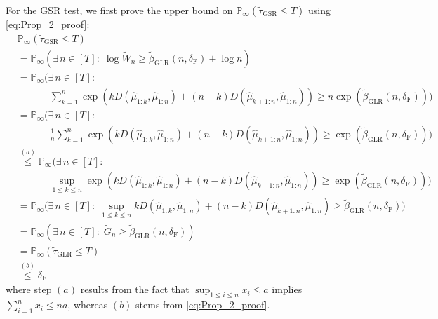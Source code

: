 \documentclass[12pt]{interact}
\newcommand{\lp}{\left(}
\newcommand{\rp}{\right)}
\newcommand{\lb}{\left[}
\newcommand{\rb}{\right]}
\newcommand{\lbp}{\left\{}
\newcommand{\rbp}{\right\}}
\newcommand{\mrm}{\mathrm}
\renewcommand{\Pr}{\mathbb{P}}
\theoremstyle{plain}
\begin{document}

For the GSR test, we first prove the upper bound on $\Pr_{\infty}\lp\tilde{\tau}_{\mrm{GSR}} \leq T \rp$ using \eqref{eq:Prop_2_proof}:
%
\begin{align}\nonumber
    &\Pr_{\infty}\lp\tilde{\tau}_{\mrm{GSR}} \leq T \rp\\\nonumber
    &=\Pr_{\infty}\lp\exists\,n\in\lb T\rb:\;\log \tilde{W}_{n}\geq\tilde{\beta}_{\mrm{GLR}}\lp n,\delta_{\mrm{F}}\rp + \log n \rp\\\nonumber
    &=\Pr_{\infty}\Bigg(\exists\,n\in\lb T\rb:\\\nonumber
    &\quad\quad\quad\;\sum_{k=1}^{n}\exp\lp k D \lp\hat{\mu}_{1:k},\hat{\mu}_{1:n}\rp+\lp n-k\rp D \lp\hat{\mu}_{k+1:n},\hat{\mu}_{1:n}\rp\rp\geq n\exp\lp\tilde{\beta}_{\mrm{GLR}}\lp n,\delta_{\mrm{F}}\rp\rp\Bigg)\\\nonumber
    &=\Pr_{\infty}\bigg(\exists\,n\in\lb T\rb:\\\nonumber
    &\quad\quad\quad\;\frac{1}{n}\sum_{k=1}^{n}\exp\lp k D \lp\hat{\mu}_{1:k},\hat{\mu}_{1:n}\rp+\lp n-k\rp D \lp\hat{\mu}_{k+1:n},\hat{\mu}_{1:n}\rp\rp\geq\exp\lp\tilde{\beta}_{\mrm{GLR}}\lp n,\delta_{\mrm{F}}\rp\rp\bigg)\\\nonumber
    &\overset{(a)}{\leq}\Pr_{\infty}\bigg(\exists\,n\in\lb T\rb:\\\nonumber
    &\quad\quad\quad\;\sup_{1\leq k\leq n}\exp\lp k D \lp\hat{\mu}_{1:k},\hat{\mu}_{1:n}\rp+\lp n-k\rp D \lp\hat{\mu}_{k+1:n},\hat{\mu}_{1:n}\rp\rp\geq\exp\lp\tilde{\beta}_{\mrm{GLR}}\lp n,\delta_{\mrm{F}}\rp\rp\bigg)\\\nonumber
    &=\Pr_{\infty}\bigg(\exists\,n\in\lb T\rb:\;\sup_{1\leq k\leq n}k D \lp\hat{\mu}_{1:k},\hat{\mu}_{1:n}\rp+\lp n-k\rp D \lp\hat{\mu}_{k+1:n},\hat{\mu}_{1:n}\rp\geq\tilde{\beta}_{\mrm{GLR}}\lp n,\delta_{\mrm{F}}\rp\bigg)\\\nonumber
    &=\Pr_{\infty}\lp\exists\,n\in\lb T\rb:\; \tilde{G}_{n}\geq\tilde{\beta}_{\mrm{GLR}}\lp n,\delta_{\mrm{F}}\rp\rp\\\nonumber
    &=\Pr_{\infty}\lp \tilde{\tau}_{\mrm{GLR}} \leq T \rp\\
    &\overset{(b)}{\leq}\delta_{\mrm{F}}\label{eq:gsr-fa-1}
\end{align}
%
where step $(a)$ results from the fact that $\sup_{1\leq i\leq n}x_{i}\leq a$ implies $\sum_{i=1}^{n}x_{i}\leq na$, whereas $(b)$ stems from \eqref{eq:Prop_2_proof}. 
\end{document}
